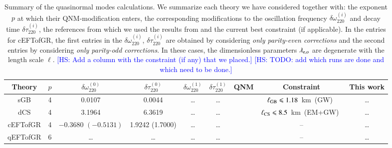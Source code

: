 \documentclass[twocolumn,prd,aps,superscriptaddress,preprintnumbers,tightenlines,showpacs,nofootinbib,eqsecnum,amsfonts,amsmath,longbibliography]{revtex4-1}
\newcommand{\hs}[1]{{\textcolor{blue}{{[HS: #1]}} }}
\begin{document}
\begin{table}[th]
\begin{tabular}{c | c c c c c c c c}
\hline
\hline
Theory & $p$ & $\delta \omega^{(0)}_{220}$ & $\delta \tau^{(0)}_{220}$ & $\delta \omega^{(1)}_{220}$ & $\delta \tau^{(1)}_{220}$ & QNM & Constraint & This work \\
\hline
sGB      & 4 & 0.0107 & 0.0044 & \dots & \dots &  \cite{Pierini:2021jxd} & $\ell_{\rm GB} \leqslant 1.18$~km~(GW)~\cite{Lyu:2022gdr} & \dots \\
dCS      & 4 & 3.1964 & 6.3619 & \dots & \dots &  \cite{Wagle:2021tam}   & $\ell_{\rm CS} \leqslant 8.5$~km~(EM+GW)~\cite{Silva:2020acr}  & \dots \\
cEFTofGR & 4 & $-0.3680$ $(-0.5131)$  & 1.9242 (1.7000) & \dots & \dots & \cite{Cano:2021myl} & --  & \dots \\
qEFTofGR & 6 & \dots & \dots & \dots & \dots & \cite{Cano:2021myl} & --  & \dots \\
\hline
\hline
\end{tabular}
\caption{Summary of the quasinormal modes calculations.
%
We summarize each theory we have considered together with: the exponent $p$ at
which their QNM-modification enters, the corresponding modifications to the
oscillation frequency $\delta \omega^{(i)}_{220}$ and decay time $\delta \tau^{(i)}_{220}$, the
references from which we used the results from and the current best constraint
(if applicable).
%
In the entries for cEFTofGR, the first entries in the $\delta
\omega^{(i)}_{220}$, $\delta \tau^{(i)}_{220}$ are obtained by considering
\emph{only parity-even corrections} and the second entries by considering
\emph{only parity-odd corrections}. In these cases, the dimensionless parameters
$\lambda_{\rm e,o}$ are degenerate with the length scale $\ell$.
%
\hs{Add a column with the constraint (if any) that we placed.}
\hs{TODO: add which runs are done and which need to be done.}
}
\label{tab:ref_theories_qnms}
\end{table}

\end{document}
